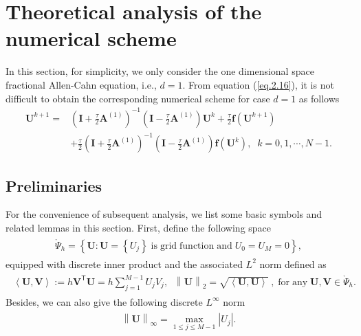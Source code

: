 \documentclass{siamart171218}
\numberwithin{theorem}{section}
\numberwithin{equation}{section}
\begin{document}
\section{Theoretical analysis of the numerical scheme}
In this section, for simplicity, we only consider the one dimensional
space fractional Allen-Cahn equation, i.e., $d=1$.
From equation (\ref{eq.2.16}), it is not difficult to obtain the corresponding numerical scheme
for case $d=1$ as follows
\begin{equation}\label{eq.3.1}
\begin{aligned}\displaystyle
\mathbf{U}^{k+1}=&\left(
\mathbf{I}+\frac{\tau}{2}\mathbf{A}^{(1)}
\right)^{-1}\left(
\mathbf{I}-\frac{\tau}{2}\mathbf{A}^{(1)}
\right)\mathbf{U}^{k}+
\frac{\tau}{2}\mathbf{f}
\left(\mathbf{U}^{k+1}\right)\\&+
\frac{\tau}{2}\left(
\mathbf{I}+\frac{\tau}{2}\mathbf{A}^{(1)}
\right)^{-1}\left(
\mathbf{I}-\frac{\tau}{2}\mathbf{A}^{(1)}
\right)\mathbf{f}\left(\mathbf{U}^{k}\right)
,\;\;k=0,1,\cdots,N-1.
\end{aligned}
\end{equation}

\subsection{Preliminaries}
For the convenience of subsequent analysis, we list some basic symbols and related lemmas in this section.
First, define the following space
\begin{eqnarray*}
\begin{array}{lll}\displaystyle
\mathring{\Psi}_h=\left\{\mathbf{U}:\mathbf{U}=\left\{U_j\right\}\;
\mathrm{is\; grid\; function\; and\;} U_0=U_M=0\right\},
\end{array}
\end{eqnarray*}
equipped with discrete inner product and the associated $L^2$
norm defined as
\begin{eqnarray*}
\begin{array}{lll}\displaystyle
\left\langle\mathbf{U},\mathbf{V}\right\rangle:=h\mathbf{V}^{\mathsf{T}}\mathbf{U}
=h\sum_{j=1}^{M-1}U_jV_j,\;\;
\left\|\mathbf{U}\right\|_2=\sqrt{\left\langle\mathbf{U},\mathbf{U}\right\rangle}\;,\;\mathrm{for}\;
\mathrm{any}\; \mathbf{U},\mathbf{V}\in\mathring{\Psi}_h.
\end{array}
\end{eqnarray*}
Besides, we can also give the following discrete $L^\infty$ norm
\begin{eqnarray*}
\begin{array}{lll}\displaystyle
\left\|\mathbf{U}\right\|_\infty=\max_{1\leq j\leq M-1}\left|U_j\right|.
\end{array}
\end{eqnarray*}
\end{document}
